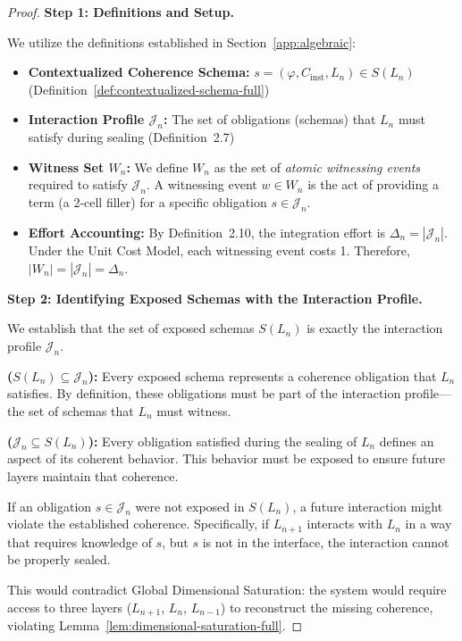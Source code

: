 \documentclass[11pt]{article}
\theoremstyle{definition}
\theoremstyle{remark}
\begin{document}
\begin{proof}
\textbf{Step 1: Definitions and Setup.}

We utilize the definitions established in Section~\ref{app:algebraic}:

\begin{itemize}
\item \textbf{Contextualized Coherence Schema:} $s = (\varphi, C_{\text{inst}}, L_n) \in S(L_n)$
(Definition~\ref{def:contextualized-schema-full})

\item \textbf{Interaction Profile $\mathcal{J}_n$:} The set of obligations (schemas) that $L_n$ must satisfy
during sealing (Definition~2.7)

\item \textbf{Witness Set $W_n$:} We define $W_n$ as the set of \emph{atomic witnessing events} required
to satisfy $\mathcal{J}_n$. A witnessing event $w \in W_n$ is the act of providing a term (a 2-cell filler)
for a specific obligation $s \in \mathcal{J}_n$.

\item \textbf{Effort Accounting:} By Definition~2.10, the integration effort is $\Delta_n = |\mathcal{J}_n|$. Under
the Unit Cost Model, each witnessing event costs 1. Therefore, $|W_n| = |\mathcal{J}_n| = \Delta_n$.
\end{itemize}

\textbf{Step 2: Identifying Exposed Schemas with the Interaction Profile.}

We establish that the set of exposed schemas $S(L_n)$ is exactly the interaction profile $\mathcal{J}_n$.

\textbf{($S(L_n) \subseteq \mathcal{J}_n$):} Every exposed schema represents a coherence obligation that $L_n$
satisfies. By definition, these obligations must be part of the interaction profile---the set of
schemas that $L_n$ must witness.

\textbf{($\mathcal{J}_n \subseteq S(L_n)$):} Every obligation satisfied during the sealing of $L_n$ defines an aspect
of its coherent behavior. This behavior must be exposed to ensure future layers maintain that
coherence.

If an obligation $s \in \mathcal{J}_n$ were not exposed in $S(L_n)$, a future interaction might violate the
established coherence. Specifically, if $L_{n+1}$ interacts with $L_n$ in a way that requires knowledge
of $s$, but $s$ is not in the interface, the interaction cannot be properly sealed.

This would contradict Global Dimensional Saturation: the system would require access to three
layers ($L_{n+1}$, $L_n$, $L_{n-1}$) to reconstruct the missing coherence, violating
Lemma~\ref{lem:dimensional-saturation-full}.


\end{proof}
\end{document}
